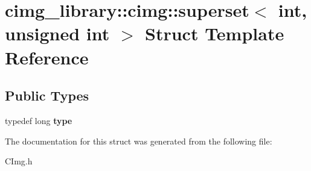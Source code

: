 \hypertarget{structcimg__library_1_1cimg_1_1superset_3_01int_00_01unsigned_01int_01_4}{\section{cimg\-\_\-library\-:\-:cimg\-:\-:superset$<$ int, unsigned int $>$ Struct Template Reference}
\label{structcimg__library_1_1cimg_1_1superset_3_01int_00_01unsigned_01int_01_4}
}
\subsection*{Public Types}
\begin{DoxyCompactItemize}
\item 
\hypertarget{structcimg__library_1_1cimg_1_1superset_3_01int_00_01unsigned_01int_01_4_a72935aa937571468f078b8366712b6ef}{typedef long {\bfseries type}}\label{structcimg__library_1_1cimg_1_1superset_3_01int_00_01unsigned_01int_01_4_a72935aa937571468f078b8366712b6ef}

\end{DoxyCompactItemize}


The documentation for this struct was generated from the following file\-:\begin{DoxyCompactItemize}
\item 
C\-Img.\-h\end{DoxyCompactItemize}
